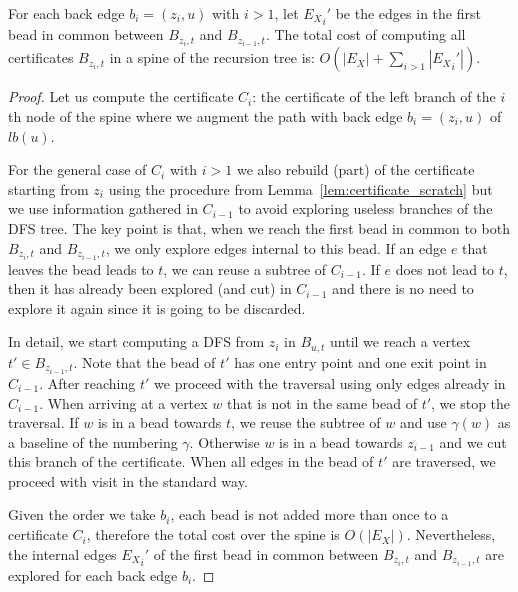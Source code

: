 \begin{lemma}
	For each back edge $b_i = (z_i,u)$ with $i>1$, let ${E_X}_i'$
	be the edges in the first bead in common between $B_{z_i,t}$
	and $B_{z_{i-1},t}$. The total cost of computing all
	certificates $B_{z_i,t}$ in a spine of the recursion tree is:
	$O(|E_X| + \sum_{i>1}{|{E_X}_i'|})$.
	\label{lem:cost-spine-not-amortized}
\end{lemma}
\begin{proof}
	Let us compute the certificate $C_i$: the certificate
	of the left branch of the $i$th node of the spine where we
	augment the path with back edge $b_i = (z_i,u)$ of
	$lb(u)$.

	For the general case of $C_i$ with $i>1$ we also rebuild
	(part) of the certificate starting from $z_i$ using the
	procedure from Lemma~\ref{lem:certificate_scratch} but we use
	information gathered in $C_{i-1}$ to avoid exploring useless
	branches of the DFS tree. The key point is that, when we reach
	the first bead in common to both $B_{z_i,t}$ and
	$B_{z_{i-1},t}$, we only explore edges internal to this bead.
	If an edge $e$ that leaves the bead leads to $t$, we can reuse
	a subtree of $C_{i-1}$. If $e$ does not lead to $t$, then it
	has already been explored (and cut) in $C_{i-1}$ and there is
	no need to explore it again since it is going to be discarded.

	In detail, we start computing a DFS from $z_i$ in $B_{u,t}$
	until we reach a vertex $t' \in B_{z_{i-1},t}$. Note that the
	bead of $t'$ has one entry point and one exit point in
	$C_{i-1}$. After reaching $t'$ we proceed with the traversal
	using only edges already in $C_{i-1}$. When arriving at a
	vertex $w$ that is not in the same bead of $t'$, we stop the
	traversal. If $w$ is in a bead towards $t$, we reuse the
	subtree of $w$ and use $\gamma(w)$ as a baseline of the
	numbering $\gamma$. Otherwise $w$ is in a bead towards
	$z_{i-1}$ and we cut this branch of the certificate. When all
	edges in the bead of $t'$ are traversed, we proceed with visit
	in the standard way.

	Given the order we take $b_i$, each bead is not added more
	than once to a certificate $C_i$, therefore the total cost
	over the spine is $O(|E_X|)$.
	Nevertheless, the internal edges ${E_X}_i'$ of the first bead
	in common between $B_{z_i,t}$ and $B_{z_{i-1},t}$ are explored
	for each back edge $b_i$.
\end{proof}

